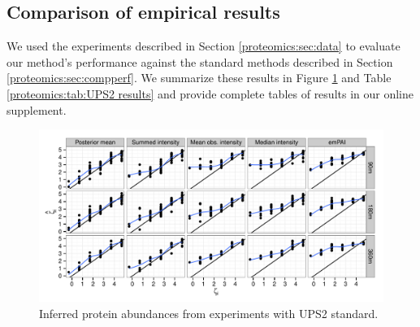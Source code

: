 
\subsection{Comparison of empirical results}
\label{proteomics:sec:dataanalysis}

We used the experiments described in Section \ref{proteomics:sec:data} to evaluate our method's performance against the standard methods described in Section \ref{proteomics:sec:compperf}.
We summarize these results in Figure \ref{proteomics:fig:UPS2 results} and Table \ref{proteomics:tab:UPS2 results} and provide complete tables of results in our online supplement.
%
\begin{figure}
\centering
\includegraphics[width=\textwidth]{figures/proteomics/figures_draft_ups2}
\caption{Inferred protein abundances from experiments with UPS2 standard.
\label{proteomics:fig:UPS2 results}}
\end{figure}
%
